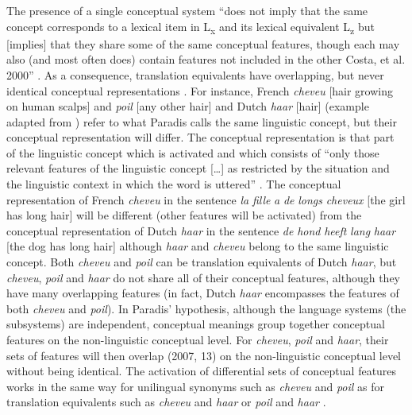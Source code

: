The presence of a single conceptual system “does not imply that the same concept corresponds to a lexical item in L\textsubscript{x} and its lexical equivalent L\textsubscript{z} but [implies] that they share some of the same conceptual features, though each may also (and most often does) contain features not included in the other \citep{paradis_bilingual_1978, auger_representation_1997,de_groot_lexical_1997} Costa, et al. 2000” \citep[198]{paradis_neurolinguistic_2004}. As a consequence, translation equivalents have overlapping, but never identical conceptual representations \citep[12]{kecskes_neurofunctional_2007}. For instance, French \textit{cheveu} [hair growing on human scalps] and \textit{poil} [any other hair] and Dutch \textit{haar} [hair] (example adapted from \citealt[201]{paradis_neurolinguistic_2004}) refer to what Paradis calls the same linguistic concept, but their conceptual representation will differ. The conceptual representation is that part of the linguistic concept which is activated and which consists of “only those relevant features of the linguistic concept […] as restricted by the situation and the linguistic context in which the word is uttered” \citep[12]{kecskes_neurofunctional_2007}. The conceptual representation of French \textit{cheveu} in the sentence \textit{la} \textit{fille} \textit{a} \textit{de} \textit{longs} \textit{cheveux} [the girl has long hair] will be different (other features will be activated) from the conceptual representation of Dutch \textit{haar} in the sentence \textit{de} \textit{hond} \textit{heeft} \textit{lang} \textit{haar} [the dog has long hair] although \textit{haar} and \textit{cheveu} belong to the same linguistic concept. Both \textit{cheveu} and \textit{poil} can be translation equivalents of Dutch \textit{haar}, but \textit{cheveu}, \textit{poil} and \textit{haar} do not share all of their conceptual features, although they have many overlapping features (in fact, Dutch \textit{haar} encompasses the features of both \textit{cheveu} and \textit{poil}). In Paradis’ hypothesis, although the language systems (the subsystems) are independent, conceptual meanings group together conceptual features on the non-linguistic conceptual level. For \textit{cheveu}, \textit{poil} and \textit{haar}, their sets of features will then overlap (2007, 13) on the non-linguistic conceptual level without being identical. The activation of differential sets of conceptual features works in the same way for unilingual synonyms such as \textit{cheveu} and \textit{poil} as for translation equivalents such as \textit{cheveu} and \textit{haar} or \textit{poil} and \textit{haar} \citep[14]{kecskes_neurofunctional_2007}.

